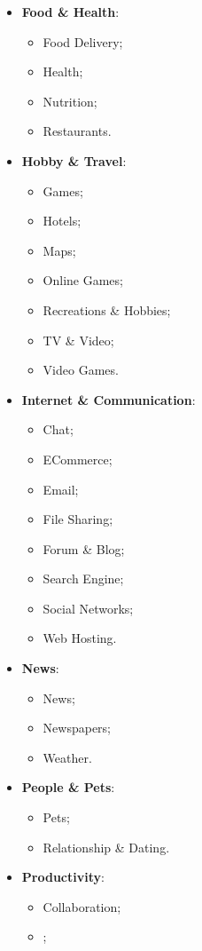 \begin{itemize}
\begin{itemize}
	\end{itemize}
\item \textbf{Food \& Health}:
	\begin{itemize}
	\item Food Delivery;
	\item Health;
	\item Nutrition;
	\item Restaurants.
	\end{itemize}
\item \textbf{Hobby \& Travel}:
	\begin{itemize}
	\item Games;
	\item Hotels;
	\item Maps;
	\item Online Games;
	\item Recreations \& Hobbies;
	\item TV \& Video;
	\item Video Games.
	\end{itemize}
\item \textbf{Internet \& Communication}:
	\begin{itemize}
	\item Chat;
	\item ECommerce;
	\item Email;
	\item File Sharing;
	\item Forum \& Blog;
	\item Search Engine;
	\item Social Networks;
	\item Web Hosting.
	\end{itemize}
\item \textbf{News}:
	\begin{itemize}
	\item News;
	\item Newspapers;
	\item Weather.
	\end{itemize}
\item \textbf{People \& Pets}:
	\begin{itemize}
	\item Pets;
	\item Relationship \& Dating.
	\end{itemize}
\item \textbf{Productivity}:
	\begin{itemize}
	\item Collaboration;
	\item {};

\end{itemize}
\end{itemize}
